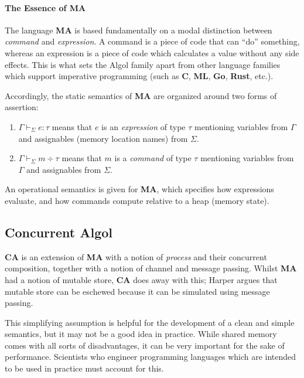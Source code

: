 \documentclass{article}
\newcommand\Lang[1]{{\sffamily\bfseries{#1}}}
\newcommand\LangCA{\Lang{CA}}
\newcommand\LangMA{\Lang{MA}}
\newcommand\EOf[4]{{#1}\vdash_{#2}{#3}:{#4}}
\newcommand\MOf[4]{{#1}\vdash_{#2}{#3}\div{#4}}
\begin{document}
\paragraph{The Essence of \LangMA{}}

The language \LangMA{} is based fundamentally on a modal distinction
between \emph{command} and \emph{expression}. A command is a piece of
code that can ``do'' something, whereas an expression is a piece of
code which calculates a value without any side effects. This is what
sets the Algol family apart from other language families which support
imperative programming (such as \Lang{C}, \Lang{ML}, \Lang{Go},
\Lang{Rust}, etc.).

Accordingly, the static semantics of \LangMA{} are organized around
two forms of assertion:

\begin{enumerate}
\item $\EOf{\Gamma}{\Sigma}{e}{\tau}$ means that $e$ is an \emph{expression}
  of type $\tau$ mentioning variables from $\Gamma$ and assignables
  (memory location names) from $\Sigma$.
\item $\MOf{\Gamma}{\Sigma}{m}{\tau}$ means that $m$ is a
  \emph{command} of type $\tau$ mentioning variables from $\Gamma$ and
  assignables from $\Sigma$.
\end{enumerate}

An operational semantics is given for \LangMA{}, which specifies how
expressions evaluate, and how commands compute relative to a heap
(memory state).



\subsection{Concurrent Algol}

\LangCA{} is an extension of \LangMA{} with a notion of \emph{process}
and their concurrent composition, together with a notion of channel
and message passing. Whilst \LangMA{} had a notion of mutable store,
\LangCA{} does away with this; Harper argues that mutable store can be
eschewed because it can be simulated using message passing.

This simplifying assumption is helpful for the development of a clean
and simple semantics, but it may not be a good idea in practice. While
shared memory comes with all sorts of disadvantages, it can be very
important for the sake of performance. Scientists who engineer
programming languages which are intended to be used in practice must
account for this.
\end{document}
